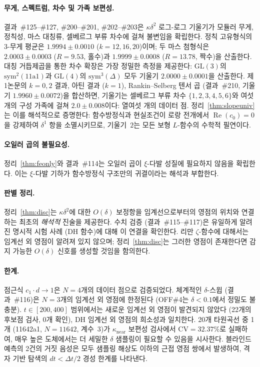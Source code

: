\documentclass[11pt, a4paper]{article}
\theoremstyle{plain}
\theoremstyle{definition}
\begin{document}
\paragraph{무게, 스펙트럼, 차수 및 가족 보편성.}
결과~\#125--\#127, \#200--\#201, \#202--\#203은 $\kappa\delta^{2}$ 로그-로그
기울기가 모듈러 무게, 정칙성, 마스 대칭류, 셀베르그 부류 차수에 걸쳐
불변임을 확립한다.
정칙 고유형식의 3-무게 평균은 $1.9994\pm 0.0010$ ($k=12,16,20$)이며;
두 마스 첨형식은 $2.0003\pm 0.0003$ ($R=9.53$, 홀수)과
$1.9999\pm 0.0008$ ($R=13.78$, 짝수)을 산출한다.
대칭 거듭제곱을 통한 차수 확장은 가장 정밀한 측정을 제공한다:
$\mathrm{GL}(3)$의 $\mathrm{sym}^{2}(\text{11a1})$과
$\mathrm{GL}(4)$의 $\mathrm{sym}^{3}(\Delta)$ 모두 기울기
$2.0000\pm 0.0001$을 산출한다.
제1논문의 $k=0,2$ 결과, 아틴 결과 ($k=1$), Rankin--Selberg 텐서 곱
(결과~\#210, 기울기 $1.9960\pm 0.0072$)을 합산하면,
기울기는 셀베르그 부류 차수 $\{1,2,3,4,5,6\}$와
여섯 개의 구성 가족에 걸쳐 $2.0\pm 0.008$이다:
열여섯 개의 데이터 점.
정리~\ref{thm:slopeuniv}는 이를 해석적으로 증명한다:
함수방정식과 현실조건이 로랑 전개에서 $\operatorname{Re}(c_0)=0$을
강제하여 $\delta^1$ 항을 소멸시키므로,
기울기~$2$는 모든 보형 $L$-함수의 수학적 필연이다.

\paragraph{오일러 곱의 불필요성.}
정리~\ref{thm:feonly}와 결과~\#114는 오일러 곱이
$\xi$-다발 성질에 필요하지 않음을 확립한다.
이는 $\xi$-다발 기하가 함수방정식 구조만의 귀결이라는
해석과 부합한다.

\paragraph{판별 정리.}
정리~\ref{thm:disc}는 $\kappa\delta^{2}$에 대한
$O(\delta)$ 보정항을 임계선으로부터의 영점의 위치와
연결하는 최초의 \emph{해석적} 진술을 제공한다.
수치 검증 (결과~\#115--\#117)은 유일하게 알려진 명시적 시험 사례
(DH 함수)에 대해 이 연결을 확인한다.
리만 $\zeta$-함수에 대해서는 임계선 외 영점이 알려져 있지 않으며;
정리~\ref{thm:disc}는 그러한 영점이 존재한다면
감지 가능한 $O(\delta)$ 신호를 생성할 것임을 함의한다.

\paragraph{한계.}
점근식 $c_{1}\cdot d \to 1$은 $N=4$개의 데이터 점으로 검증되었다.
체계적인 $\delta$-스윕 (결과~\#116)은
$N=3$개의 임계선 외 영점에 한정된다
(OFF\#4는 $\delta<0.1$에서 정밀도 불충분).
$t\in[200,400]$ 범위에서는 새로운 임계선 외 영점이
발견되지 않았다 (22개의 후보점 검사, 0개 확인),
DH 임계선 외 영점의 희소성과 일치한다.
20개 타원곡선 중 1개 (11642a1, $N=11642$, 계수~3)가
$\kappa_{\mathrm{near}}$ 보편성 검사에서 CV${}=32.37\%$로 실패하여,
매우 높은 도체에서는 더 세밀한 $\delta$ 샘플링이 필요할 수 있음을 시사한다.
블라인드 예측의 2건의 거짓 음성은 모두 샘플링 해상도 이하의
근접 영점 쌍에서 발생하여, 격자 기반 탐색의
$dt < \Delta t/2$ 경성 한계를 나타낸다.
\end{document}
